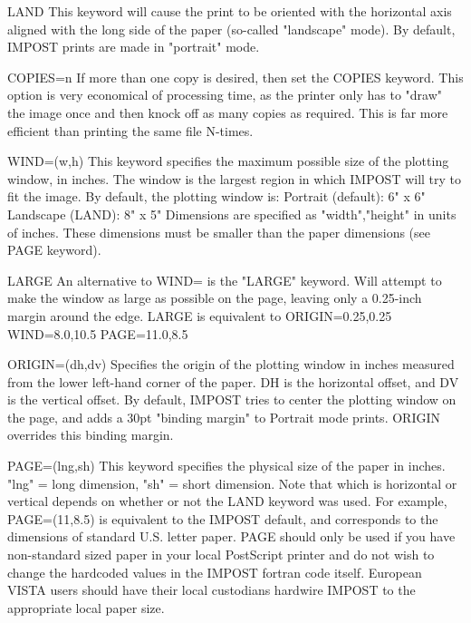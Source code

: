 {\newpage\clearpage
{}%
\begin{example}
  \item[LAND]{This keyword will cause the print to be oriented with the
         horizontal axis aligned with the long side of the paper 
         (so-called "landscape" mode).  By default, IMPOST prints are 
         made in "portrait" mode.}
  \item[COPIES=n]{If more than one copy is desired, then set the COPIES keyword.
         This option is very economical of processing time, as the
         printer only has to "draw" the image once and then knock off
         as many copies as required.  This is far more efficient than 
         printing the same file N-times.}
  \item[WIND=(w,h)]{This keyword specifies the maximum possible size of the
         plotting window, in inches.  The window is the largest
         region in which IMPOST will try to fit the image.
         By default, the plotting window is:
             Portrait (default):  6" x 6"
               Landscape (LAND):  8" x 5"
         Dimensions are specified as "width","height" in units of inches.
         These dimensions must be smaller than the paper dimensions 
         (see PAGE keyword).}
  \item[LARGE]{An alternative to WIND= is the "LARGE" keyword.  Will attempt
         to make the window as large as possible on the page, leaving only
         a 0.25-inch margin around the edge.  LARGE is equivalent to
            ORIGIN=0.25,0.25  WIND=8.0,10.5  PAGE=11.0,8.5}
  \item[ORIGIN=(dh,dv)]{Specifies the origin of the plotting window
         in inches measured from the lower left-hand corner of the 
         paper.  DH is the horizontal offset, and DV is the vertical
         offset.  By default, IMPOST tries to center the plotting 
         window on the page, and adds a 30pt "binding margin" to 
         Portrait mode prints.  ORIGIN overrides this binding margin.}
  \item[PAGE=(lng,sh)]{This keyword specifies the physical size of the paper in
         inches.  "lng" = long dimension, "sh" = short dimension.
         Note that which is horizontal or vertical depends on
         whether or not the LAND keyword was used.  For example, 
         PAGE=(11,8.5) is equivalent to the IMPOST default, and
         corresponds to the dimensions of standard U.S. letter
         paper.  PAGE should only be used if you have non-standard 
         sized paper in your local PostScript printer and do not
         wish to change the hardcoded values in the IMPOST fortran
         code itself.  European VISTA users should have their
         local custodians hardwire IMPOST to the appropriate local
         paper size.}
\end{example}%
\lthtmlfigureZ
\lthtmlcheckvsize\clearpage}

